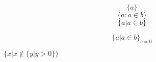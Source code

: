 \documentclass{article}
\begin{document}
\[ \{ a \} \]
\[ \{ a : a\in b \} \]
\[ \{ a | a\in b \} \]

\[ \{ a | a\in b \}_{c=0} \]

$ \{ x | x \not\in \{ y | y > 0 \} \} $
\end{document}

